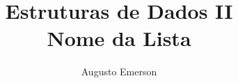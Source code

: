 \documentclass{article}
\title{
    \textbf{Estruturas de Dados II}\\
    Nome da Lista
}
\author{
    Augusto Emerson\\
}
\date{} %
\begin{document}
\begin{titlepage}
    \maketitle
    \thispagestyle{empty}  
\end{titlepage}
\end{document}
